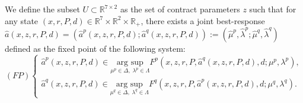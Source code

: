 \documentclass[12pt]{article}
\begin{document}
We define the subset $U \subset \mathbb{R}^{7 \times 2}$ as the set of contract parameters $z$ such that for any state $(x,r,P,d) \in \mathbb{R}^7 \times \mathbb{R}^2 \times \mathbb{R}_+$, there exists a joint best-response $\hat{a}(x,z,r,P,d) = (\hat{a}^p(x,z,r,P,d); \hat{a}^q(x,z,r,P,d)) := (\hat{\mu}^p, \hat{\lambda}^p; \hat{\mu}^q, \hat{\lambda}^q)$ defined as the fixed point of the following system:
\begin{equation*}
(FP)
\begin{cases}
\hat{a}^p(x,z,r,P,d) \in \underset{\mu^p \in \Delta, \; \lambda^p \in \Lambda}{\text{arg sup}} F^p(x,z,r,P, \hat{a}^q(x,z,r,P,d),d;\mu^p,\lambda^p), \\
\hat{a}^q(x,z,r,P,d) \in \underset{\mu^q \in \Delta, \; \lambda^q \in \Lambda}{\text{arg sup}} F^q(x,z,r,P, \hat{a}^p(x,z,r,P,d),d;\mu^q,\lambda^q).
\end{cases}
\end{equation*}
\end{document}
